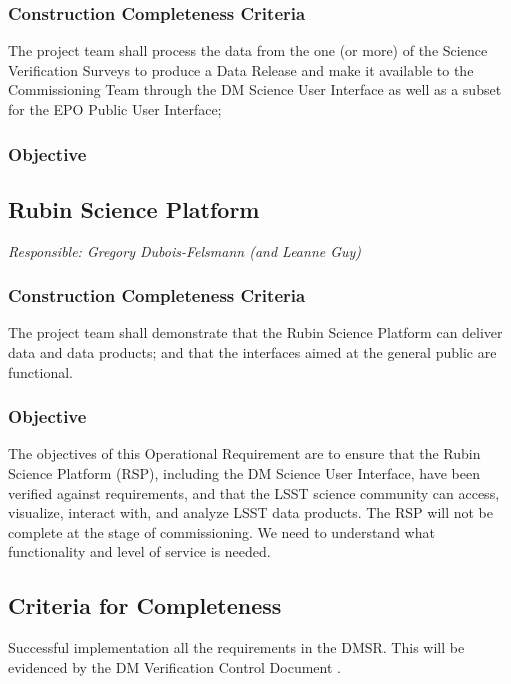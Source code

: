 \subsubsection{Construction Completeness Criteria}
The project team shall process the data from the one (or more) of the Science Verification Surveys to produce a Data Release and make it available to the Commissioning Team through the DM Science User Interface as well as a subset for the EPO Public User Interface;

\subsubsection{Objective} 



\subsection{Rubin Science Platform}
{\it Responsible: Gregory Dubois-Felsmann (and Leanne Guy)}

\subsubsection{Construction Completeness Criteria}
The project team shall demonstrate that the Rubin Science Platform can deliver data and data products; and that the interfaces aimed at the general public are functional.

\subsubsection{Objective} 
The objectives of this Operational Requirement are to ensure that the Rubin Science Platform (RSP), including the DM Science User Interface, have been verified against requirements, and that the LSST science community can access, visualize, interact with, and analyze LSST data products. The RSP will not be complete at the stage of commissioning.  We need to understand what functionality and level of service is needed.
 
 

\subsection{Criteria for Completeness} 
Successful implementation all the requirements in the DMSR. 
This will be evidenced by the DM Verification Control Document .

